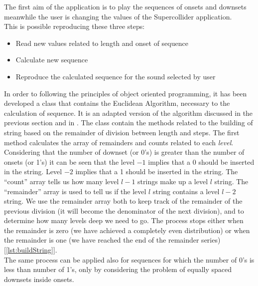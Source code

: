 \documentclass[main.tex]{subfiles}
\begin{document}
The first aim of the application is to play the sequences of onsets and downsets meanwhile the user is changing the values of the Supercollider application.\\
This is possible reproducing these three steps:
\begin{itemize}[noitemsep]
\item Read new values related to length and onset of sequence
\item Calculate new sequence
\item Reproduce the calculated sequence for the sound selected by user
\end{itemize}
In order to following the principles of object oriented programming, it has been developed a class that contains the Euclidean Algorithm, necessary to the calculation of sequence. It is an adapted version of the algorithm discussed in the previous section and in \cite{Bjorklund:2003:euclidean:rhythm}. The class contain the methods related to the building of string based on the remainder of division between length and steps. The first method calculates the array of remainders and counts related to each \textit{level}. Considering that the number of downset (or 0's) is greater than the number of onsets (or 1's) it can be seen that the level \begin{math}-1\end{math} implies that a 0 should be inserted in
the string. Level \begin{math}-2\end{math} implies that a 1 should be inserted in the string. The “count”
array tells us how many level \begin{math}l-1\end{math} strings make up a level \begin{math}l\end{math} string. The “remainder” array is used to tell us if the level \begin{math}l\end{math} string contains a level \begin{math}l-2\end{math} string. We use the remainder array both to keep track of the remainder of the previous division (it will become the denominator of the next
division), and to determine how many levels deep we need to go. The process stops
either when the remainder is zero (we have achieved a completely even distribution) or
when the remainder is one (we have reached the end of the remainder series) [\autoref{lst:buildString}].\\
The same process can be applied also for sequences for which the number of 0's is less than number of 1's, only by considering the problem of equally spaced downsets inside onsets.
\end{document}
